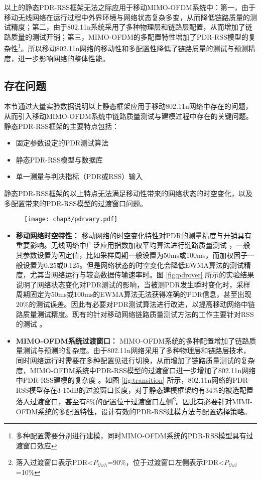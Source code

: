 以上的静态PDR-RSS框架无法之际应用于移动MIMO-OFDM系统中：第一，由于移动无线网络在运行过程中外界环境与网络状态复杂多变，从而降低链路质量的测试精度；第二，由于802.11n系统采用了多种物理层和链路层配置，从而增加了链路质量的测试开销；第三，MIMO-OFDM的多配置特性增加了PDR-RSS模型的复杂性\footnote{多种配置需要分别进行建模，同时MIMO-OFDM系统的PDR-RSS模型具有过渡窗口效应}。所以移动802.11n网络的移动性和多配置性降低了链路质量的测试与预测精度，进一步影响网络的整体性能。

\subsection{存在问题}
\label{sec:prob3}

本节通过大量实验数据说明以上静态框架应用于移动802.11n网络中存在的问题，从而引入移动MIMO-OFDM系统中链路质量测试与建模过程中存在的关键问题。静态PDR-RSS框架的主要特点包括：
\begin{itemize}
  \item 固定参数设定的PDR测试算法
  \item 静态PDR-RSS模型与数据库
  \item 单一测量与判决指标（PDR或RSS）输入
\end{itemize}
静态PDR-RSS框架的以上特点无法满足移动性带来的网络状态的时空变化，以及多配置带来的PDR-RSS模型的过渡窗口问题。

\begin{figure}[!htp]
\centering
    \texttt{[image: chap3/pdrvary.pdf]}
\end{figure}

\begin{itemize}
  \item \textbf{移动网络时空特性：}
  移动网络的时空变化特性对PDR的测量精度与开销具有重要影响。无线网络中广泛应用指数加权平均算法进行链路质量测试   ，一般其参数设置为固定值，比如采样周期一般设置为50ms或100ms，而加权因子一般设置为0.25或0.125。但是网络状态的时空变化会降低EWMA算法的测试精度，尤其当网络运行与较高数据传输速率时。图 \ref{fig:pdrover} 所示的实验结果说明了网络状态变化对PDR测试的影响，当被测PDR发生瞬时变化时，采样周期固定为50ms或100ms的EWMA算法无法获得准确的PDR信息，甚至出现20\%的测试误差。因此有必要对PDR测试算法进行改进，以提高移动网络中链路质量测试精度。现有的针对移动网络链路质量测试方法的工作主要针对RSS的测试  。
  \item \textbf{MIMO-OFDM系统过渡窗口：}
  MIMO-OFDM系统的多种配置增加了链路质量测试与预测的复杂度。由于802.11n网络采用了多种物理层和链路层技术，同时网络运行时需要在多种配置见进行切换，从而增加了链路质量测试的复杂度，MIMO-OFDM系统中PDR-RSS模型的过渡窗口进一步增加了802.11n网络中PDR-RSS建模的复杂度 。如图 \ref{fig:transition} 所示，802.11n网络的PDR-RSS模型存在3-15dB的过渡窗口长度，对于静态建模框架约有34\%的被选配置落入过渡窗口，甚至有8\%的配置位于过渡窗口左侧\footnote{落入过渡窗口表示PDR<$P_{thrh}$=90\%，位于过渡窗口左侧表示PDR<$P_{thrl}$=10\%}。因此有必要针对MIMI-OFDM系统的多配置特性，设计有效的PDR-RSS建模方法与配置选择策略。
\end{itemize}

